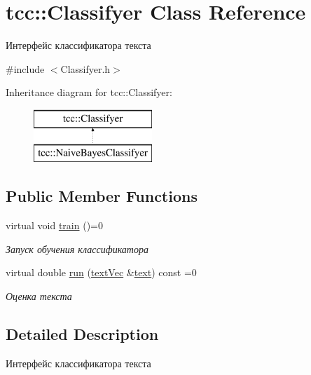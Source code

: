 \hypertarget{classtcc_1_1_classifyer}{}\section{tcc\+:\+:Classifyer Class Reference}
\label{classtcc_1_1_classifyer}


Интерфейс классификатора текста  




{\ttfamily \#include $<$Classifyer.\+h$>$}

Inheritance diagram for tcc\+:\+:Classifyer\+:\begin{figure}[H]
\begin{center}
\leavevmode
\includegraphics[height=2.000000cm]{classtcc_1_1_classifyer}
\end{center}
\end{figure}
\subsection*{Public Member Functions}
\begin{DoxyCompactItemize}
\item 
virtual void \hyperlink{classtcc_1_1_classifyer_a31a89d27c030b89964770d7ab5db7850}{train} ()=0\hypertarget{classtcc_1_1_classifyer_a31a89d27c030b89964770d7ab5db7850}{}\label{classtcc_1_1_classifyer_a31a89d27c030b89964770d7ab5db7850}

\begin{DoxyCompactList}\small\item\em Запуск обучения классификатора \end{DoxyCompactList}\item 
virtual double \hyperlink{classtcc_1_1_classifyer_a13db939fe0720f111df9266e1eef54c0}{run} (\hyperlink{namespacetcc_a9bdf9e81347b7904a6a7f8427d6465dc}{text\+Vec} \&\hyperlink{group__aliases_ga085c5ca5bf5645ff17c0ede30f56b08f}{text}) const  =0
\begin{DoxyCompactList}\small\item\em Оценка текста \end{DoxyCompactList}\end{DoxyCompactItemize}


\subsection{Detailed Description}
Интерфейс классификатора текста 

